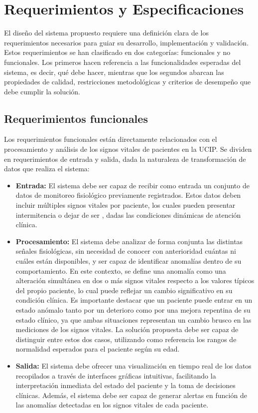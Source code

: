 \chapter{Requerimientos y Especificaciones}

El diseño del sistema propuesto requiere una definición clara de los requerimientos necesarios para guiar su desarrollo, implementación y validación. Estos requerimientos se han clasificado en dos categorías: funcionales y no funcionales. Los primeros hacen referencia a las funcionalidades esperadas del sistema, es decir, qué debe hacer, mientras que los segundos abarcan las propiedades de calidad, restricciones metodológicas y criterios de desempeño que debe cumplir la solución.

\section{Requerimientos funcionales}

Los requerimientos funcionales están directamente relacionados con el procesamiento y análisis de los signos vitales de pacientes en la UCIP. Se dividen en requerimientos de entrada y salida, dada la naturaleza de transformación de datos que realiza el sistema:

\begin{itemize}
  \item \textbf{Entrada:} El sistema debe ser capaz de recibir como entrada un conjunto de datos de monitoreo fisiológico previamente registrados. Estos datos deben incluir múltiples signos vitales por paciente, los cuales pueden presentar intermitencia o dejar de ser , dadas las condiciones dinámicas de atención clínica.

  \item \textbf{Procesamiento:} El sistema debe analizar de forma conjunta las distintas señales fisiológicas, sin necesidad de conocer con anterioridad cuántas ni cuáles están disponibles, y ser capaz de identificar anomalías dentro de su comportamiento. En este contexto, se define una anomalía como una alteración simultánea en dos o más signos vitales respecto a los valores típicos del propio paciente, lo cual puede reflejar un cambio significativo en su condición clínica. Es importante destacar que un paciente puede entrar en un estado anómalo tanto por un deterioro como por una mejora repentina de su estado clínico, ya que ambas situaciones representan un cambio brusco en las mediciones de los signos vitales. La solución propuesta debe ser capaz de distinguir entre estos dos casos, utilizando como referencia los rangos de normalidad esperados para el paciente según su edad.

  \item \textbf{Salida:} El sistema debe ofrecer una visualización en tiempo real de los datos recopilados a través de interfaces gráficas intuitivas, facilitando la interpretación inmediata del estado del paciente y la toma de decisiones clínicas. Además, el sistema debe ser capaz de generar alertas en función de las anomalías detectadas en los signos vitales de cada paciente.

\end{itemize}

